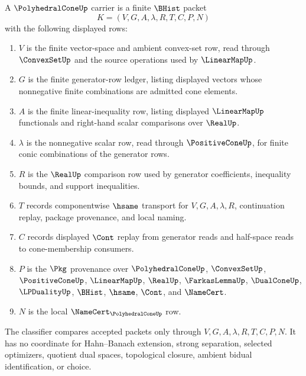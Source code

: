 \begin{definition}
\label{def:polyhedral-cone-carrier}
A $\PolyhedralConeUp$ carrier is a finite $\BHist$ packet
$$
K=(V,G,A,\lambda,R,T,C,P,N)
$$
with the following displayed rows:
\begin{enumerate}
\item $V$ is the finite vector-space and ambient convex-set row, read through $\ConvexSetUp$ and the source operations used by $\LinearMapUp$.
\item $G$ is the finite generator-row ledger, listing displayed vectors whose nonnegative finite combinations are admitted cone elements.
\item $A$ is the finite linear-inequality row, listing displayed $\LinearMapUp$ functionals and right-hand scalar comparisons over $\RealUp$.
\item $\lambda$ is the nonnegative scalar row, read through $\PositiveConeUp$, for finite conic combinations of the generator rows.
\item $R$ is the $\RealUp$ comparison row used by generator coefficients, inequality bounds, and support inequalities.
\item $T$ records componentwise $\hsame$ transport for $V,G,A,\lambda,R$, continuation replay, package provenance, and local naming.
\item $C$ records displayed $\Cont$ replay from generator reads and half-space reads to cone-membership consumers.
\item $P$ is the $\Pkg$ provenance over $\PolyhedralConeUp$, $\ConvexSetUp$, $\PositiveConeUp$, $\LinearMapUp$, $\RealUp$, $\FarkasLemmaUp$, $\DualConeUp$, $\LPDualityUp$, $\BHist$, $\hsame$, $\Cont$, and $\NameCert$.
\item $N$ is the local $\NameCert_{\PolyhedralConeUp}$ row.
\end{enumerate}
The classifier compares accepted packets only through $V,G,A,\lambda,R,T,C,P,N$. It has no coordinate for Hahn--Banach extension, strong separation, selected optimizers, quotient dual spaces, topological closure, ambient bidual identification, or choice.
\end{definition}

